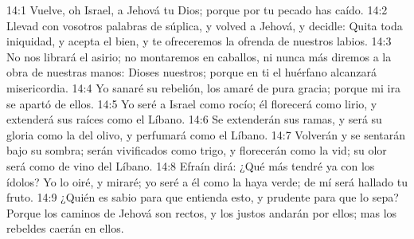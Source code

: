 													14:1 Vuelve, oh Israel, a Jehová tu Dios; porque por tu pecado has caído. 
													14:2 Llevad con vosotros palabras de súplica, y volved a Jehová, y decidle: Quita toda iniquidad, y acepta el bien, y te ofreceremos la ofrenda de nuestros labios. 
													14:3 No nos librará el asirio; no montaremos en caballos, ni nunca más diremos a la obra de nuestras manos: Dioses nuestros; porque en ti el huérfano alcanzará misericordia. 
													14:4 Yo sanaré su rebelión, los amaré de pura gracia; porque mi ira se apartó de ellos. 
													14:5 Yo seré a Israel como rocío; él florecerá como lirio, y extenderá sus raíces como el Líbano. 
													14:6 Se extenderán sus ramas, y será su gloria como la del olivo, y perfumará como el Líbano. 
													14:7 Volverán y se sentarán bajo su sombra; serán vivificados como trigo, y florecerán como la vid; su olor será como de vino del Líbano. 
													14:8 Efraín dirá: ¿Qué más tendré ya con los ídolos? Yo lo oiré, y miraré; yo seré a él como la haya verde; de mí será hallado tu fruto. 
													14:9 ¿Quién es sabio para que entienda esto, y prudente para que lo sepa? Porque los caminos de Jehová son rectos, y los justos andarán por ellos; mas los rebeldes caerán en ellos.